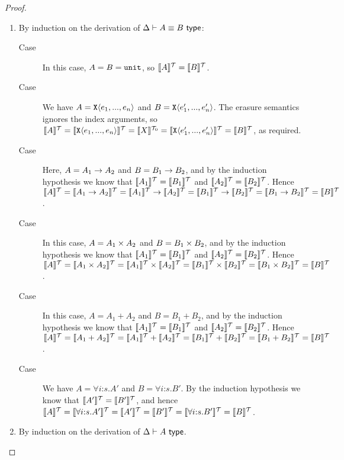 \begin{proof}
  \begin{enumerate}
  \item By induction on the derivation of $\Delta \vdash A \equiv B
    \isType$:
    \begin{description}
    \item[Case ] In this case, $A = B = \tyUnit$, so
      $\tySem{A} = \tySem{B}$.
    \item[Case ] We have $A =
      \tyPrim{X}{e_1,...,e_n}$ and $B =
      \tyPrim{X}{e'_1,...,e'_n}$. The erasure semantics ignores the
      index arguments, so $\tySem{A} = \tySem{\tyPrim{X}{e_1,...,e_n}}
      = \tyPrimSem{X} = \tySem{\tyPrim{X}{e'_1,...,e'_n}} =
      \tySem{B}$, as required.
    \item[Case ] Here, $A = A_1 \tyArr A_2$ and $B =
      B_1 \tyArr B_2$, and by the induction hypothesis we know that
      $\tySem{A_1} = \tySem{B_1}$ and $\tySem{A_2} =
      \tySem{B_2}$. Hence $\tySem{A} = \tySem{A_1 \tyArr A_2} =
      \tySem{A_1} \to \tySem{A_2} = \tySem{B_1} \to \tySem{B_2} =
      \tySem{B_1 \tyArr B_2} = \tySem{B}$.
    \item[Case ] In this case, $A = A_1 \tyProduct
      A_2$ and $B = B_1 \tyProduct B_2$, and by the induction
      hypothesis we know that $\tySem{A_1} = \tySem{B_1}$ and
      $\tySem{A_2} = \tySem{B_2}$. Hence $\tySem{A} = \tySem{A_1
        \tyProduct A_2} = \tySem{A_1} \times \tySem{A_2} = \tySem{B_1}
      \times \tySem{B_2} = \tySem{B_1 \tyProduct B_2} = \tySem{B}$.
    \item[Case ] In this case, $A = A_1 + A_2$ and $B
      = B_1 + B_2$, and by the induction hypothesis we know that
      $\tySem{A_1} = \tySem{B_1}$ and $\tySem{A_2} =
      \tySem{B_2}$. Hence $\tySem{A} = \tySem{A_1 + A_2} = \tySem{A_1}
      + \tySem{A_2} = \tySem{B_1} + \tySem{B_2} = \tySem{B_1 + B_2} =
      \tySem{B}$.
    \item[Case ] We have $A = \forall
      i\mathord:s.A'$ and $B = \forall i\mathord:s.B'$. By the
      induction hypothesis we know that $\tySem{A'} = \tySem{B'}$, and
      hence $\tySem{A} = \tySem{\forall i\mathord:s. A'} = \tySem{A'}
      = \tySem{B'} = \tySem{\forall i\mathord:s. B'} = \tySem{B}$.
    \end{description}
  \item By induction on the derivation of $\Delta \vdash A \isType$.
    \begin{description}

\end{description}
\end{enumerate}
\end{proof}
